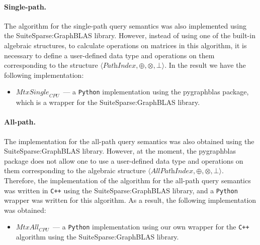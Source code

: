 \paragraph{Single-path.} %
The algorithm for the single-path query semantics was also implemented using the SuiteSparse:GraphBLAS library. However, instead of using one of the built-in algebraic structures, to calculate operations on matrices in this algorithm, it is necessary to define a user-defined data type and operations on them corresponding to the structure $\langle \textit{PathIndex}, \oplus, \otimes, \bot \rangle$. In the result we have the following implementation:
\begin{itemize}
    \item $\textit{MtxSingle}_{\textit{CPU}}$~--- a \texttt{Python} implementation using the pygraphblas package, which is a wrapper for the SuiteSparse:GraphBLAS library.
\end{itemize}

\paragraph{All-path.} %
The implementation for the all-path query semantics was also obtained using the SuiteSparse:GraphBLAS library. However, at the moment, the pygraphblas package does not allow one to use a user-defined data type and operations on them corresponding to the algebraic structure $\langle \textit{AllPathIndex}, \oplus, \otimes, \bot \rangle$. Therefore, the implementation of the algorithm for the all-path query semantics was written in \texttt{C++} using the SuiteSparse:GraphBLAS library, and a \texttt{Python} wrapper was written for this algorithm. As a result, the following implementation was obtained:
\begin{itemize}
    \item $\textit{MtxAll}_{\textit{CPU}}$~--- a \texttt{Python} implementation using our own wrapper for the \texttt{C++} algorithm using the SuiteSparse:GraphBLAS library.
\end{itemize}

